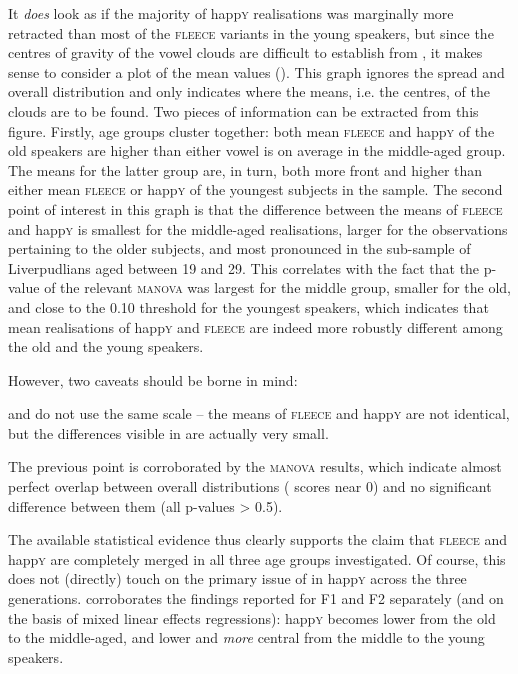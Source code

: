 It \emph{does} look as if the majority of happ\textsc{y} realisations was marginally more retracted than most of the \textsc{fleece} variants in the young speakers, but since the centres of gravity of the vowel clouds are difficult to establish from , it makes sense to consider a plot of the mean values ().
This graph ignores the spread and overall distribution and only indicates where the means, i.e. the centres, of the  clouds are to be found.
Two pieces of information can be extracted from this figure.
Firstly, age groups cluster together: both mean \textsc{fleece} and happ\textsc{y} of the old speakers are higher than either vowel is on average in the middle-aged group.
The means for the latter group are, in turn, both more front and higher than either mean \textsc{fleece} or happ\textsc{y} of the youngest subjects in the sample.
The second point of interest in this graph is that the difference between the means of \textsc{fleece} and happ\textsc{y} is smallest for the middle-aged realisations, larger for the observations pertaining to the older subjects, and most pronounced in the sub-sample of Liverpudlians aged between 19 and 29.
This correlates with the fact that the p-value of the relevant \textsc{manova} was largest for the middle group, smaller for the old, and close to the 0.10 threshold for the youngest speakers, which indicates that mean realisations of happ\textsc{y} and \textsc{fleece} are indeed more robustly different among the old and the young speakers.

However, two caveats should be borne in mind:
\begin{inparaenum}[(1)]
	\item {} and  do not use the same scale -- the means of \textsc{fleece} and happ\textsc{y} are not identical, but the differences visible in  are actually very small.
	\item The previous point is corroborated by the \textsc{manova} results, which indicate almost perfect overlap between overall distributions ( scores near 0) and no significant difference between them (all p-values > 0.5).
\end{inparaenum}
The available statistical evidence thus clearly supports the claim that \textsc{fleece} and happ\textsc{y} are completely merged in all three age groups investigated.
Of course, this does not (directly) touch on the primary issue of  in happ\textsc{y} across the three generations.
 corroborates the findings reported for F1 and F2 separately (and on the basis of mixed linear effects regressions): happ\textsc{y} becomes lower from the old to the middle-aged, and lower and \emph{more} central from the middle to the young speakers.

